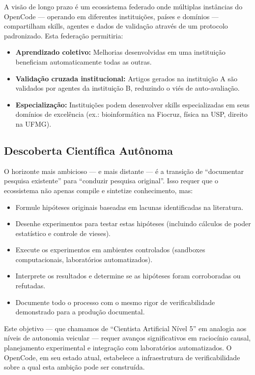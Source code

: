 A visão de longo prazo é um ecossistema federado onde múltiplas instâncias do OpenCode --- operando em diferentes instituições, países e domínios --- compartilham skills, agentes e dados de validação através de um protocolo padronizado. Esta federação permitiria:

\begin{itemize}
  \item \textbf{Aprendizado coletivo:} Melhorias desenvolvidas em uma instituição beneficiam automaticamente todas as outras.
  \item \textbf{Validação cruzada institucional:} Artigos gerados na instituição A são validados por agentes da instituição B, reduzindo o viés de auto-avaliação.
  \item \textbf{Especialização:} Instituições podem desenvolver skills especializadas em seus domínios de excelência (ex.: bioinformática na Fiocruz, física na USP, direito na UFMG).
\end{itemize}

\subsection{Descoberta Científica Autônoma}

O horizonte mais ambicioso --- e mais distante --- é a transição de ``documentar pesquisa existente'' para ``conduzir pesquisa original''. Isso requer que o ecossistema não apenas compile e sintetize conhecimento, mas:

\begin{itemize}
  \item Formule hipóteses originais baseadas em lacunas identificadas na literatura.
  \item Desenhe experimentos para testar estas hipóteses (incluindo cálculos de poder estatístico e controle de vieses).
  \item Execute os experimentos em ambientes controlados (sandboxes computacionais, laboratórios automatizados).
  \item Interprete os resultados e determine se as hipóteses foram corroboradas ou refutadas.
  \item Documente todo o processo com o mesmo rigor de verificabilidade demonstrado para a produção documental.
\end{itemize}

Este objetivo --- que chamamos de ``Cientista Artificial Nível 5'' em analogia aos níveis de autonomia veicular --- requer avanços significativos em raciocínio causal, planejamento experimental e integração com laboratórios automatizados. O OpenCode, em seu estado atual, estabelece a infraestrutura de verificabilidade sobre a qual esta ambição pode ser construída.

